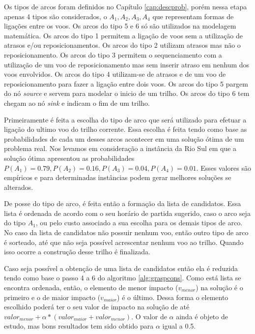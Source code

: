 Os tipos de arcos foram definidos no Capítulo \ref{cap:descprob}, porém nessa
etapa apenas 4 tipos são considerados, o   $A_{1},A_{2},A_{3},A_{4}$ que
representam formas de ligações entre os voos. Os arcos do tipo 5 e 6 só são
utilizados na modelagem matemática. Os arcos do tipo 1 permitem a
ligação de voos sem a utilização de atrasos e/ou reposicionamentos. Os arcos do
tipo 2 utilizam atrasos mas não o reposicionamento. Os arcos do tipo 3 permitem
o sequenciamento com a utilização de um voo de reposicionamento mas sem inserir
atraso em nenhum dos voos envolvidos. Os arcos do tipo 4 utilizam-se de atrasos
e de um voo de reposicionamento para fazer a ligação entre dois voos. Os arcos
do tipo 5 pargem do nó \textit{source} e servem para modelar o inicio de um
trilho. Os arcos do tipo 6 tem chegam ao nó \textit{sink} e indicam o fim de um
trilho.

Primeiramente é feita a escolha do tipo de arco que será utilizado para efetuar
a ligação do ultimo voo do trilho corrente. Essa escolha é feita tendo
como base as probabilidades de cada um desses arcos acontecer em uma solução
ótima de um problema real. Nos levamos em consideração a instância da Rio Sul em
que a solução ótima apresentou as probabilidades
$P(A_{1})=0.79,P(A_{2})=0.16,P(A_{3})=0.04,P(A_{4})=0.01$. Esses valores são
empíricos e para determinadas instâncias podem gerar melhores soluções se
alterados.

 
De posse do tipo de arco, é feita então a formação da lista de candidatos. Essa
lista é ordenada de acordo com o seu horário de partida sugerido, caso o arco
seja do tipo $A_{1}$, ou pelo custo associado a sua escolha para os demais
tipos de arco. No caso da lista de candidatos não possuir nenhum voo, então
outro tipo de arco é sorteado, até que não seja possível acrescentar nenhum voo
ao trilho. Quando isso ocorre a construção desse trilho é finalizada.
 
Caso seja possível a obtenção de uma lista de candidatos então ela é reduzida
tendo como base o passo 4 a 6 do algoritmo \ref{alg:graspcons}. Como está lista
se encontra ordenada, então, o elemento de menor impacto ($v_{menor}$) na
solução é o primeiro e o de maior impacto ($v_{maior}$) é o último. Dessa forma
o elemento escolhido poderá ter o seu valor de impacto na solução de até
$valor_{menor} + \alpha*(valor_{maior} + valor_{menor})$. O valor de $\alpha$
ainda é objeto de estudo, mas bons resultados tem sido obtido para $\alpha$
igual a 0.5.
 
